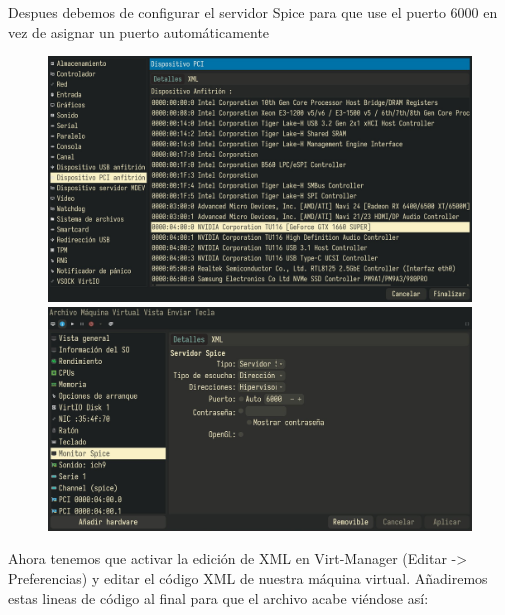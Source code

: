 \documentclass[12pt]{article}
\begin{document}
Despues debemos de configurar el servidor Spice para que use el puerto 6000 en vez de asignar un puerto automáticamente

\begin{figure}[h]
\centering
\begin{minipage}[b]{0.4\textwidth}
\includegraphics[height=0.6\textwidth,width=\textwidth]{images/card-add.jpg}
\end{minipage}
\hspace{10pt}
\begin{minipage}[b]{0.4\textwidth}
\includegraphics[height=0.6\textwidth,width=\textwidth]{images/spice-conf.jpg}
\end{minipage}
\end{figure}

Ahora tenemos que activar la edición de XML en Virt-Manager (Editar -> Preferencias) y editar el código XML de nuestra máquina virtual. Añadiremos estas lineas de código al final para que el archivo acabe viéndose así:
\end{document}
